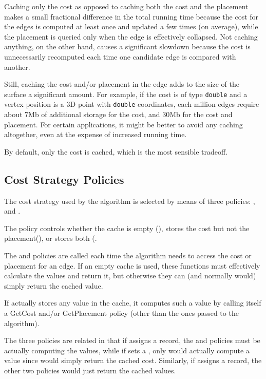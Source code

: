 Caching only the cost as opposed to caching both the cost and the placement makes a
small fractional difference in the total running time because the cost for the
edges is computed at least once and updated a few times (on average), while the 
placement is queried only when the edge is effectively collapsed. Not caching 
anything, on the other hand, causes a significant slowdown because the cost is
unnecessarily recomputed each time one candidate edge is compared with another.

Still, caching the cost and/or placement in the edge adds to the size of the surface 
a significant amount. For example, if the cost is of type {\tt double} and a vertex
position is a 3D point with {\tt double} coordinates, each million edges require 
about 7Mb of additional storage for the cost, and 30Mb for the cost and placement.
For certain applications, it might be better to avoid any caching altogether, even 
at the expense of increased running time.
 
By default, only the cost is cached, which is the most sensible tradeoff.

\subsection{Cost Strategy Policies}

The cost strategy used by the algorithm is selected by means of three policies: 
,  and . 

The  policy controls whether the cache is empty (), 
stores the cost but not the placement(), or stores both 
(.

The  and  policies are called each time
the algorithm needs to access the cost or placement for an edge.
If an empty cache is used, these functions must effectively
calculate the values and return it, but otherwise they can 
(and normally would) simply return the cached value.

If  actually stores any value in the cache, it computes
such a value by calling itself a GetCost and/or GetPlacement
policy (other than the ones passed to the algorithm).

The three policies are related in that if 
assigns a  record, the  and  policies
must be actually computing the values, while if  sets a 
, only  would actually compute a value since
 would simply return the cached cost.
Similarly, if  assigns a  record, 
the other two policies would just return the cached values.

